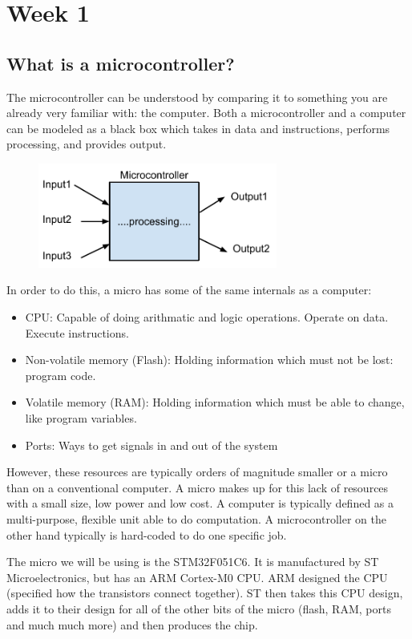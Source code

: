 \section{Week 1}

\subsection{What is a microcontroller?}
The microcontroller can be understood by comparing it to something you are already very familiar with: the computer. Both a microcontroller and a computer can be modeled as a black box which takes in data and instructions, performs processing, and provides output.
\begin{figure}
  \centering
\includegraphics[width=0.7\textwidth]{./week1/processing}
\end{figure}
In order to do this, a micro has some of the same internals as a computer:
\begin{itemize}
  \item CPU: Capable of doing arithmatic and logic operations. Operate on data. Execute instructions. 
  \item Non-volatile memory (Flash): Holding information which must not be lost: program code.
  \item Volatile memory (RAM): Holding information which must be able to change, like program variables.
  \item Ports: Ways to get signals in and out of the system
\end{itemize}
However, these resources are typically orders of magnitude smaller or a micro than on a conventional computer. A micro makes up for this lack of resources with a small size, low power and low cost. 
A computer is typically defined as a multi-purpose, flexible unit able to do computation. A microcontroller on the other hand typically is hard-coded to do one specific job.

The micro we will be using is the STM32F051C6. It is manufactured by ST Microelectronics, but has an ARM Cortex-M0 CPU. ARM designed the CPU (specified how the transistors connect together). ST then takes this CPU design, adds it to their design for all of the other bits of the micro (flash, RAM, ports and much much more) and then produces the chip.

